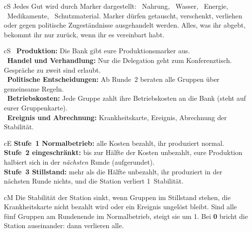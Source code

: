 \begin{metrobox}[title={1 \ Marker},fonttitle=\bfseries]{cS}
Jedes Gut wird durch Marker dargestellt: \rN~Nahrung, \rW~Wasser, \rE~Energie, \rM~Medikamente, \rS~Schutzmaterial. Marker dürfen getauscht, verschenkt, verliehen oder gegen politische Zugeständnisse ausgehandelt werden. Alles, was ihr abgebt, bekommt ihr nur zurück, wenn ihr es vereinbart habt.
\end{metrobox}

\begin{metrobox}[title={2 \ Eine Runde (\ifkurz 24 \else 16 \fi Stunden Spielzeit)},fonttitle=\bfseries]{cS}
~\textbf{Produktion:} Die Bank gibt eure Produktionsmarker aus.\\
~\textbf{Handel und Verhandlung:} Nur die Delegation geht zum Konferenztisch. Gespräche zu zweit sind erlaubt.\\
~\textbf{Politische Entscheidungen:} Ab Runde~2 beraten alle Gruppen über gemeinsame Regeln.\\
~\textbf{Betriebskosten:} Jede Gruppe zahlt ihre Betriebskosten an die Bank (steht auf eurer Gruppenkarte).\\
~\textbf{Ereignis und Abrechnung:} Krankheitskarte, Ereignis, Abrechnung der Stabilität.
\end{metrobox}

\begin{metrobox}[title={3 \ Betriebskosten und Stufen},fonttitle=\bfseries]{cE}
\textbf{Stufe~1 Normalbetrieb:} alle Kosten bezahlt, ihr produziert normal.\\
\textbf{Stufe~2 eingeschränkt:} bis zur Hälfte der Kosten unbezahlt, eure Produktion halbiert sich in der \emph{nächsten} Runde (aufgerundet).\\
\textbf{Stufe~3 Stillstand:} mehr als die Hälfte unbezahlt, ihr produziert in der nächsten Runde nichts, und die Station verliert 1~Stabilität.
\end{metrobox}

\begin{metrobox}[title={4 \ Stabilität (Start: 10 Punkte)},fonttitle=\bfseries]{cM}
Die Stabilität der Station sinkt, wenn Gruppen im Stillstand stehen, die Krankheitskarte nicht bezahlt wird oder ein Ereignis ungelöst bleibt. Sind alle fünf Gruppen am Rundenende im Normalbetrieb, steigt sie um 1. Bei \textbf{0} bricht die Station auseinander: dann verlieren alle.
\end{metrobox}


